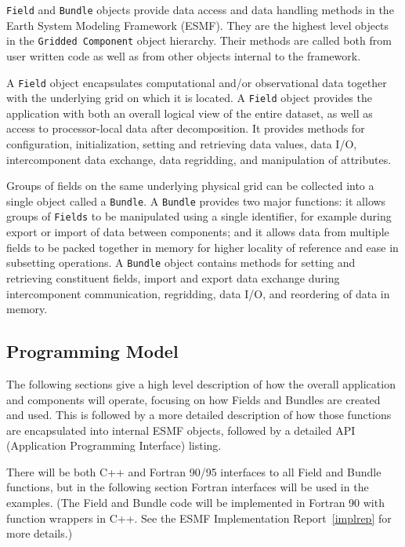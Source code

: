 
{\tt Field} and {\tt Bundle} objects provide 
data access and data handling methods
in the Earth System Modeling Framework (ESMF).
They are the highest level objects in the
{\tt Gridded Component} object hierarchy.
Their methods are called both from user written
code as well as from other objects internal to the framework.

A {\tt Field} 
object encapsulates computational and/or observational data together 
with the underlying grid on which it is located.  
A {\tt Field} object provides the
application with both an overall logical view of the entire
dataset, as well as access to processor-local data after decomposition.
It provides methods for configuration, initialization, setting and
retrieving data values, data I/O, intercomponent data 
exchange, data regridding, and manipulation of attributes.

Groups of fields on the same underlying physical grid 
can be collected into a single
object called a {\tt Bundle}.  
A {\tt Bundle} provides two major functions: it allows groups of 
{\tt Fields}
to be manipulated using a single identifier, for example during
export or import of data between components; and it allows
data from multiple fields to be packed together in memory 
for higher locality of reference and ease in subsetting operations.
A {\tt Bundle} object contains methods
for setting and retrieving constituent fields, import and export
data exchange during intercomponent communication,
regridding, data I/O, and reordering of data in memory.

\subsection{Programming Model}

The following sections give a high level description of how
the overall application and components will operate,
focusing on how Fields and Bundles are created and used.
This is followed by a more detailed description of how
those functions are encapsulated into internal ESMF 
objects, followed by a detailed API (Application Programming
Interface) listing.

There will be both C++ and Fortran 90/95 interfaces to
all Field and Bundle functions, but in the following section
Fortran interfaces will be used in the examples.
(The Field and Bundle code will be
implemented in Fortran 90 with function wrappers in C++.
See the ESMF Implementation 
Report~\ref{implrep} for more details.)

